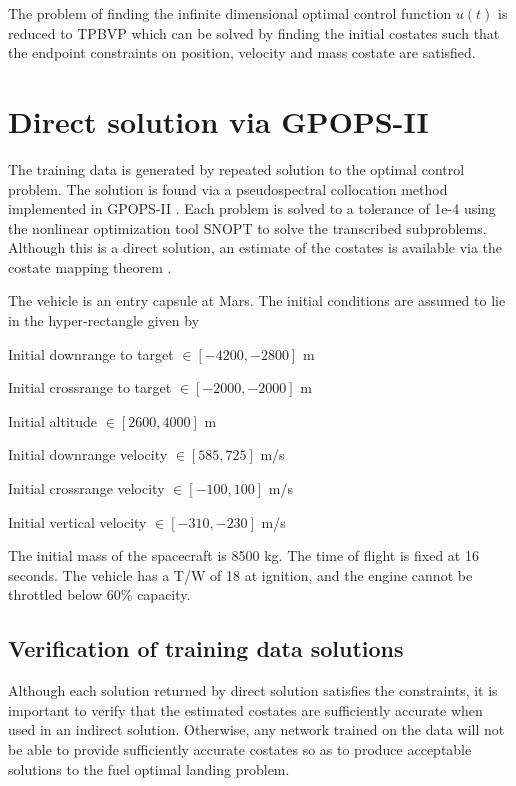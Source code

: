 \documentclass[10pt,a4paper]{article}
\begin{document}
 The problem of finding the infinite dimensional optimal control function $u(t)$ is reduced to TPBVP which can be solved by finding the initial costates such that the endpoint constraints on position, velocity and mass costate are satisfied.

\section{Direct solution via GPOPS-II}
The training data is generated by repeated solution to the optimal control problem. The solution is found via a pseudospectral collocation method implemented in GPOPS-II \cite{gpops}. Each problem is solved to a tolerance of 1e-4 using the nonlinear optimization tool SNOPT \cite{snopt} to solve the transcribed subproblems. Although this is a direct solution, an estimate of the costates is available via the costate mapping theorem \cite{costate}.

The vehicle is an entry capsule at Mars. The initial conditions are assumed to lie in the hyper-rectangle given by 
\begin{list}{}{spacing}
\item Initial downrange to target $\in[-4200, -2800]$ m
\item Initial crossrange to target $\in[-2000, -2000]$ m
\item Initial altitude $\in[2600, 4000]$ m
\item Initial downrange velocity $\in[585, 725]$ m/s
\item Initial crossrange velocity $\in[-100, 100]$ m/s
\item Initial vertical velocity $\in[-310, -230]$ m/s
\end{list}
The initial mass of the spacecraft is 8500 kg. The time of flight is fixed at 16 seconds. 
The vehicle has a T/W of 18 at ignition, and the engine cannot be throttled below 60\% capacity. 

\subsection{Verification of training data solutions}
Although each solution returned by direct solution satisfies the constraints, it is important to verify that the estimated costates are sufficiently accurate when used in an indirect solution. Otherwise, any network trained on the data will not be able to provide sufficiently accurate costates so as to produce acceptable solutions to the fuel optimal landing problem.
\end{document}

